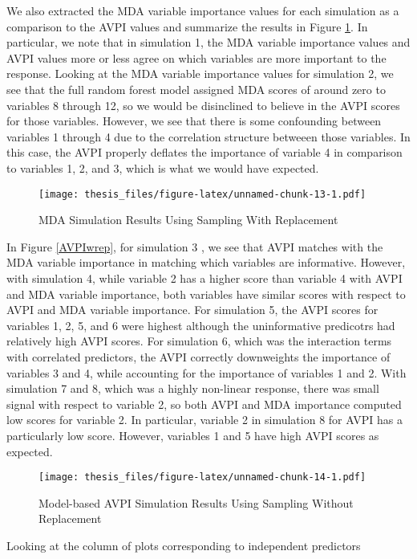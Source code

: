 \documentclass[12pt,twoside]{reedthesis}
\theoremstyle{definition}
\theoremstyle{definition}
\theoremstyle{definition}
\theoremstyle{remark}
\begin{document}
We also extracted the MDA variable importance values for each simulation
as a comparison to the AVPI values and summarize the results in Figure
\ref{MDAwrep}. In particular, we note that in simulation 1, the MDA
variable importance values and AVPI values more or less agree on which
variables are more important to the response. Looking at the MDA
variable importance values for simulation 2, we see that the full random
forest model assigned MDA scores of around zero to variables 8 through
12, so we would be disinclined to believe in the AVPI scores for those
variables. However, we see that there is some confounding between
variables 1 through 4 due to the correlation structure betweeen those
variables. In this case, the AVPI properly deflates the importance of
variable 4 in comparison to variables 1, 2, and 3, which is what we
would have expected. \par
\begin{figure}
\centering
\texttt{[image: thesis\_files/figure-latex/unnamed-chunk-13-1.pdf]}
\caption{\label{fig:unnamed-chunk-13}\label{MDAwrep}MDA Simulation Results
Using Sampling With Replacement}
\end{figure}
In Figure \ref{AVPIwrep}, for simulation 3 , we see that AVPI matches
with the MDA variable importance in matching which variables are
informative. However, with simulation 4, while variable 2 has a higher
score than variable 4 with AVPI and MDA variable importance, both
variables have similar scores with respect to AVPI and MDA variable
importance. For simulation 5, the AVPI scores for variables 1, 2, 5, and
6 were highest although the uninformative predicotrs had relatively high
AVPI scores. For simulation 6, which was the interaction terms with
correlated predictors, the AVPI correctly downweights the importance of
variables 3 and 4, while accounting for the importance of variables 1
and 2. With simulation 7 and 8, which was a highly non-linear response,
there was small signal with respect to variable 2, so both AVPI and MDA
importance computed low scores for variable 2. In particular, variable 2
in simulation 8 for AVPI has a particularly low score. However,
variables 1 and 5 have high AVPI scores as expected. \par 
\begin{figure}
\centering
\texttt{[image: thesis\_files/figure-latex/unnamed-chunk-14-1.pdf]}
\caption{\label{fig:unnamed-chunk-14}\label{AVPIworep}Model-based AVPI
Simulation Results Using Sampling Without Replacement}
\end{figure}
Looking at the column of plots corresponding to independent predictors
\end{document}
